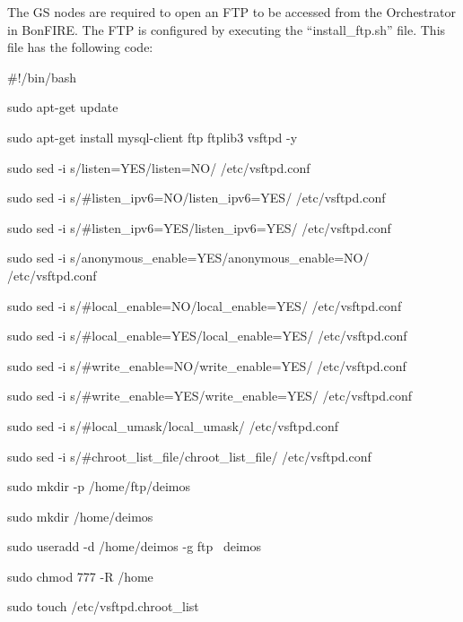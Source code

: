 \documentclass[a4paper]{article}
\begin{document}
\bigskip

The GS nodes are required to open an FTP to be accessed from the
Orchestrator in BonFIRE. The FTP is configured by executing the
{\textquotedblleft}install\_ftp.sh{\textquotedblright} file. This file
has the following code:


\bigskip

{\ttfamily
\#!/bin/bash}


\bigskip

{\ttfamily
sudo apt-get update}

{\ttfamily
sudo apt-get install mysql-client ftp ftplib3 vsftpd -y}

{\ttfamily
sudo sed -i {\textquotedbl}s/listen=YES/listen=NO/{\textquotedbl}
/etc/vsftpd.conf}

{\ttfamily
sudo sed -i
{\textquotedbl}s/\#listen\_ipv6=NO/listen\_ipv6=YES/{\textquotedbl}
/etc/vsftpd.conf}

{\ttfamily
sudo sed -i
{\textquotedbl}s/\#listen\_ipv6=YES/listen\_ipv6=YES/{\textquotedbl}
/etc/vsftpd.conf}

{\ttfamily
sudo sed -i
{\textquotedbl}s/anonymous\_enable=YES/anonymous\_enable=NO/{\textquotedbl}
/etc/vsftpd.conf}

{\ttfamily
sudo sed -i
{\textquotedbl}s/\#local\_enable=NO/local\_enable=YES/{\textquotedbl}
/etc/vsftpd.conf}

{\ttfamily
sudo sed -i
{\textquotedbl}s/\#local\_enable=YES/local\_enable=YES/{\textquotedbl}
/etc/vsftpd.conf}

{\ttfamily
sudo sed -i
{\textquotedbl}s/\#write\_enable=NO/write\_enable=YES/{\textquotedbl}
/etc/vsftpd.conf}

{\ttfamily
sudo sed -i
{\textquotedbl}s/\#write\_enable=YES/write\_enable=YES/{\textquotedbl}
/etc/vsftpd.conf}

{\ttfamily
sudo sed -i {\textquotedbl}s/\#local\_umask/local\_umask/{\textquotedbl}
/etc/vsftpd.conf}

{\ttfamily
sudo sed -i
{\textquotedbl}s/\#chroot\_list\_file/chroot\_list\_file/{\textquotedbl}
/etc/vsftpd.conf}

{\ttfamily
sudo mkdir -p /home/ftp/deimos}

{\ttfamily
sudo mkdir /home/deimos}

{\ttfamily
sudo useradd -d /home/deimos -g ftp \ deimos}

{\ttfamily
sudo chmod 777 -R /home}

{\ttfamily
sudo touch /etc/vsftpd.chroot\_list}
\end{document}

